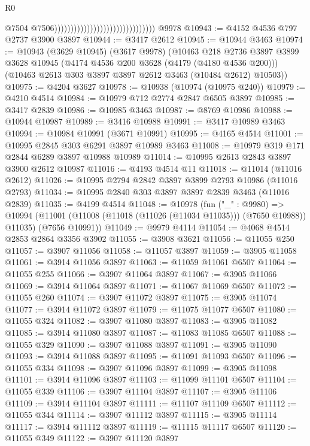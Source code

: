 \begin{lexlean}{R0}
\begin{coremodule}
                                                                  @7504
                                                                  @7506)))))))))))))))))))))))))))))))
    @9978
@10943 := @4152 @4536 @797 @2737 @3900 @3897
@10944 := @3417 @2612
@10945 := @10944 @3463
@10974 := @10943
    (@3629 @10945)
    (@3617 @9978)
    (@10463
      @218
      @2736
      @3897
      @3899
      @3628
      @10945
      (@4174 @4536 @200 @3628 (@4179 (@4180 @4536 @200)))
      (@10463 @2613 @303 @3897 @3897 @2612 @3463 (@10484 @2612) @10503))
@10975 := @4204 @3627
@10978 := @10938 (@10974 (@10975 @240))
@10979 := @4210 @4514
@10984 := @10979 @712 @2774 @2847 @6505 @3897
@10985 := @3417 @2839
@10986 := @10985 @3463
@10987 := @8769 @10986
@10988 := @10944 @10987
@10989 := @3416 @10988
@10991 := @3417 @10989 @3463
@10994 := @10984 @10991 (@3671 @10991)
@10995 := @4165 @4514
@11001 := @10995 @2845 @303 @6291 @3897 @10989 @3463
@11008 := @10979 @319 @171 @2844 @6289 @3897 @10988 @10989
@11014 := @10995 @2613 @2843 @3897 @3900 @2612 @10987
@11016 := @4193 @4514 @11
@11018 := @11014 (@11016 @2612)
@11026 := @10995 @2794 @2842 @3897 @3899 @2793 @10986 (@11016 @2793)
@11034 := @10995 @2840 @303 @3897 @3897 @2839 @3463 (@11016 @2839)
@11035 := @4199 @4514
@11048 := @10978
    (fun ("_" : @9980) =>
    @10994 (@11001 (@11008 (@11018 (@11026 (@11034 @11035))) (@7650 @10988)) @11035) (@7656 @10991))
@11049 := @9979 @4114
@11054 := @4068 @4514 @2853 @2864 @3356 @3902
@11055 := @3908 @3621
@11056 := @11055 @250
@11057 := @3907 @11056
@11058 := @11057 @3897
@11059 := @3905 @11058
@11061 := @3914 @11056 @3897
@11063 := @11059 @11061 @6507
@11064 := @11055 @255
@11066 := @3907 @11064 @3897
@11067 := @3905 @11066
@11069 := @3914 @11064 @3897
@11071 := @11067 @11069 @6507
@11072 := @11055 @260
@11074 := @3907 @11072 @3897
@11075 := @3905 @11074
@11077 := @3914 @11072 @3897
@11079 := @11075 @11077 @6507
@11080 := @11055 @324
@11082 := @3907 @11080 @3897
@11083 := @3905 @11082
@11085 := @3914 @11080 @3897
@11087 := @11083 @11085 @6507
@11088 := @11055 @329
@11090 := @3907 @11088 @3897
@11091 := @3905 @11090
@11093 := @3914 @11088 @3897
@11095 := @11091 @11093 @6507
@11096 := @11055 @334
@11098 := @3907 @11096 @3897
@11099 := @3905 @11098
@11101 := @3914 @11096 @3897
@11103 := @11099 @11101 @6507
@11104 := @11055 @339
@11106 := @3907 @11104 @3897
@11107 := @3905 @11106
@11109 := @3914 @11104 @3897
@11111 := @11107 @11109 @6507
@11112 := @11055 @344
@11114 := @3907 @11112 @3897
@11115 := @3905 @11114
@11117 := @3914 @11112 @3897
@11119 := @11115 @11117 @6507
@11120 := @11055 @349
@11122 := @3907 @11120 @3897

\end{coremodule}
\end{lexlean}
